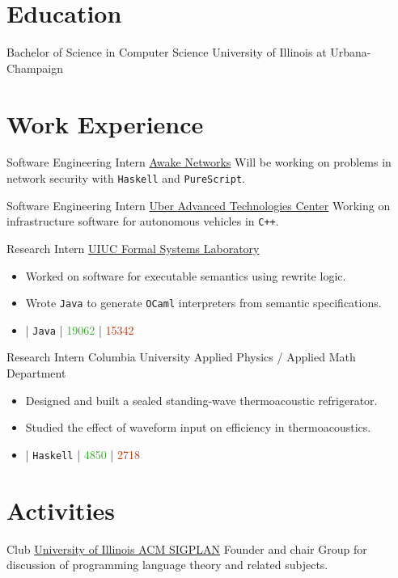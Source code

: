 \documentclass[10pt,letterpaper,sans]{moderncv}
\newcommand{\wlink}[2]{\textcolor[HTML]{0020B6}{\href{#1}{#2}}}
\newcommand{\ghlink}[2]{\wlink{https://github.com/#1}{#2}}
\newcommand{\ghrepo}[1]{\ghlink{#1}{\faGithub}}
\newcommand{\ghlang}[1]{\texttt{#1}}
\newcommand{\ghadd}[1]{\textcolor[HTML]{30A622}{{\faPlusCircle} #1}}
\newcommand{\ghrem}[1]{\textcolor[HTML]{BD2C00}{{\faMinusCircle} #1}}
\newcommand{\ghub}[4]{\ghrepo{#2} | \ghlang{#1} | \ghadd{#3} | \ghrem{#4}}
\begin{document}
\makecvtitle{}

\section{Education}
        {Bachelor of Science in Computer Science}
        {University of Illinois at Urbana-Champaign}
        {}{}
        {}

\section{Work Experience}
        {Software Engineering Intern}
        {\wlink{http://www.awakenetworks.com}{Awake Networks}}
        {}{}
        {
Will be working on problems in network security with \texttt{Haskell} and \texttt{PureScript}.
}

        {Software Engineering Intern}
        {\wlink{https://www.uber.com/info/atc}{Uber Advanced Technologies Center}}
        {}{}
        {
Working on infrastructure software for autonomous vehicles in \texttt{C++}.
}

        {Research Intern}
        {\wlink{http://fsl.cs.illinois.edu}{UIUC Formal Systems Laboratory}}
        {}{}{
\begin{itemize}
\item Worked on software for executable semantics using rewrite logic.
\item Wrote \texttt{Java} to generate \texttt{OCaml} interpreters from
      semantic specifications.
\item \ghub{Java}{taktoa/k}{19062}{15342}
\end{itemize}
}

        {Research Intern}
        {Columbia University Applied Physics / Applied Math Department}
        {}{}{
\begin{itemize}
\item Designed and built a sealed standing-wave thermoacoustic refrigerator.
\item Studied the effect of waveform input on efficiency in thermoacoustics.
\item \ghub{Haskell}{taktoa/ThermoCalc}{4850}{2718}
\end{itemize}
}

\section{Activities}
        {Club}
        {\wlink{http://category.engineering}{University of Illinois ACM SIGPLAN}}
        {Founder and chair}{}{
Group for discussion of programming language theory and related subjects.
}
\end{document}
